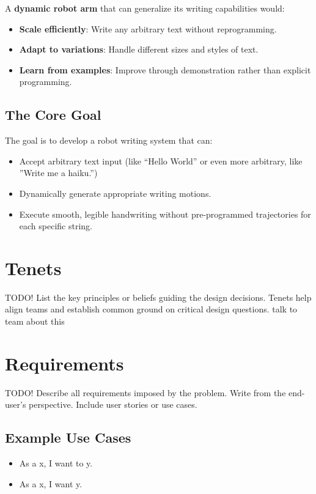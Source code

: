 \documentclass[12pt,a4paper]{article}
\begin{document}
A \textbf{dynamic robot arm} that can generalize its writing capabilities would:
\begin{itemize}
    \item \textbf{Scale efficiently}: Write any arbitrary text without reprogramming.
    \item \textbf{Adapt to variations}: Handle different sizes and styles of text.
    \item \textbf{Learn from examples}: Improve through demonstration rather than explicit programming.
\end{itemize}

\subsection{The Core Goal}

The goal is to develop a robot writing system that can:
\begin{itemize}
    \item Accept arbitrary text input (like ``Hello World'' or even more arbitrary, like ''Write me a haiku.'')
    \item Dynamically generate appropriate writing motions.
    \item Execute smooth, legible handwriting without pre-programmed trajectories for each specific string.
\end{itemize}
\newpage
\section{Tenets}
TODO!
List the key principles or beliefs guiding the design decisions.  
Tenets help align teams and establish common ground on critical design questions.
talk to team about this
\newpage
\section{Requirements}
TODO! Describe all requirements imposed by the problem.  
Write from the end-user’s perspective. Include user stories or use cases.

\subsection*{Example Use Cases}
\begin{itemize}
  \item As a x, I want to y.
  \item As a x, I want y.
\end{itemize}
\end{document}
